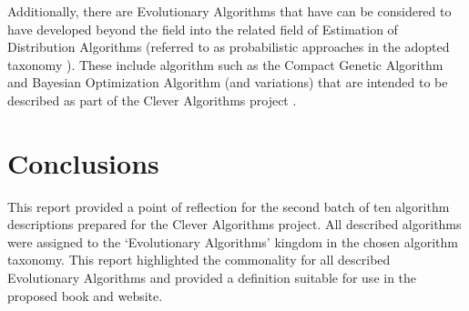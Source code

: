 \documentclass[a4paper, 11pt]{article}
\begin{document}
Additionally, there are Evolutionary Algorithms that have can be considered to have developed beyond the field into the related field of Estimation of Distribution Algorithms (referred to as probabilistic approaches in the adopted taxonomy \cite{Brownlee2010b}). These include algorithm such as the Compact Genetic Algorithm and Bayesian Optimization Algorithm (and variations) that are intended to be described as part of the Clever Algorithms project \cite{Brownlee2010b}.

% 
% 
\section{Conclusions}
\label{sec:conclusions}
This report provided a point of reflection for the second batch of ten algorithm descriptions prepared for the Clever Algorithms project. All described algorithms were assigned to the `Evolutionary Algorithms' kingdom in the chosen algorithm taxonomy. This report highlighted the commonality for all described Evolutionary Algorithms and provided a definition suitable for use in the proposed book and website.




\end{document}
